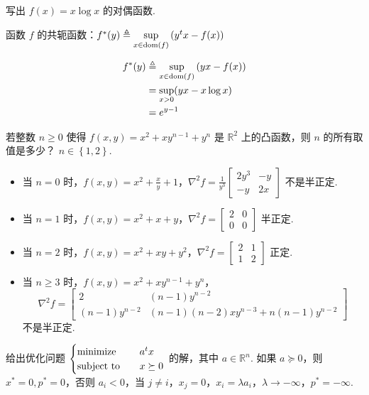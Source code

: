 \begin{problem}[问答]
    写出 $f(x) = x\log x$ 的对偶函数.
    \begin{theorem}
        函数 $f$ 的共轭函数：$f^{*}(y) \triangleq \underset{x \in \operatorname{dom}(f)}{\sup}\left(y^{t} x-f(x)\right)$
    \end{theorem}
    \Answer \begin{align*}
        f^*(y) &\triangleq \underset{x \in \operatorname{dom}(f)}{\sup}\left(y x-f(x)\right)\\
        &= \underset{x > 0}{\sup} (yx - x\log x)\\
        &= e^{y - 1}        
    \end{align*}
\end{problem}

\begin{problem}[问答]
    若整数 $n \ge 0$ 使得 $f(x, y) = x^2 + xy^{n - 1} + y^n$ 是 $\mathbb{R}^2$ 上的凸函数，则 $n$ 的所有取值是多少？
    \Answer $n \in \left\{1, 2\right\}. $\begin{itemize}
        \item 当 $n = 0$ 时，$f(x, y) = x^2 + \frac{x}{y} + 1$，$\nabla^2 f = \frac{1}{y^3}\begin{bmatrix}
            2y^3 & -y\\
            -y & 2x
        \end{bmatrix}$ 不是半正定.
        \item 当 $n = 1$ 时，$f(x, y) = x^2 + x + y$，$\nabla^2 f = \begin{bmatrix}
            2 & 0 \\
            0 & 0
        \end{bmatrix}$ 半正定.
        \item 当 $n = 2$ 时，$f(x, y) = x^2 + xy + y^2$，$\nabla^2f = \begin{bmatrix}
            2 & 1\\
            1 & 2
        \end{bmatrix}$ 正定.
        \item 当 $n \ge 3$ 时，$f(x, y) = x^2 + xy^{n - 1} + y^n$，\[\nabla^2f = \begin{bmatrix}
            2 & (n - 1)y^{n - 2}\\
            (n - 1)y^{n - 2} & (n - 1)(n - 2)xy^{n - 3} + n(n - 1)y^{n - 2}
        \end{bmatrix}\] 不是半正定.
    \end{itemize}
\end{problem}

\begin{problem}[问答]
    给出优化问题 $\begin{cases}
        \operatorname{minimize} \quad & a^tx\\
        \operatorname{subject\ to} \quad & x \succeq 0
    \end{cases}$ 的解，其中 $a\in \mathbb{R}^n$.
    \Answer 如果 $a \succeq 0$，则 $x^* = 0, p^* = 0$，否则 $a_i < 0$，当 $j \neq i$，$x_j = 0$，$x_i = \lambda a_i$，$\lambda \to -\infty$，$p^* = -\infty$.
\end{problem}

